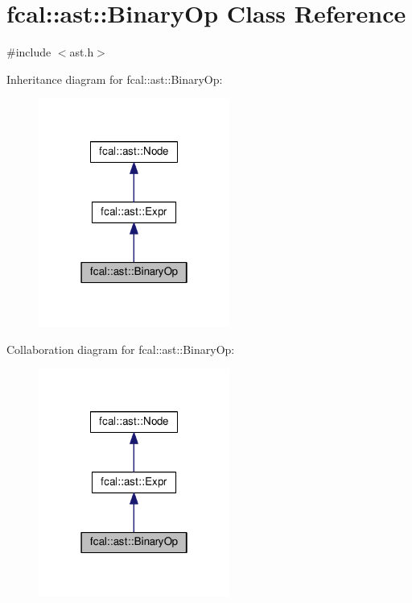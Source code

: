 \hypertarget{classfcal_1_1ast_1_1BinaryOp}{}\section{fcal\+:\+:ast\+:\+:Binary\+Op Class Reference}
\label{classfcal_1_1ast_1_1BinaryOp}


{\ttfamily \#include $<$ast.\+h$>$}



Inheritance diagram for fcal\+:\+:ast\+:\+:Binary\+Op\+:
\nopagebreak
\begin{figure}[H]
\begin{center}
\leavevmode
\includegraphics[width=178pt]{classfcal_1_1ast_1_1BinaryOp__inherit__graph}
\end{center}
\end{figure}


Collaboration diagram for fcal\+:\+:ast\+:\+:Binary\+Op\+:
\nopagebreak
\begin{figure}[H]
\begin{center}
\leavevmode
\includegraphics[width=178pt]{classfcal_1_1ast_1_1BinaryOp__coll__graph}
\end{center}
\end{figure}
